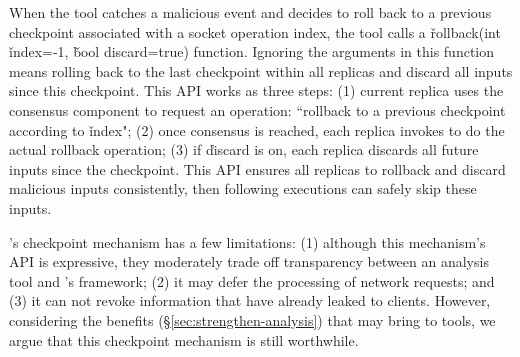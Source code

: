 When the tool catches a malicious event and decides to roll back to a previous
checkpoint associated with a socket operation index, the tool calls a 
\v{rollback(int} \v{index=-1,} \v{bool discard=true)} function. Ignoring the 
arguments in this function means rolling back to the last checkpoint within all 
replicas and discard all inputs since this checkpoint. This API works as three 
steps: (1) current replica uses the \paxos consensus component to request an 
operation: ``rollback to a previous checkpoint according to \v{index}"; (2) 
once consensus is reached, each replica invokes \criu to do the actual rollback 
operation; (3) if \v{discard} is on, each replica discards all future inputs 
since the checkpoint. This API ensures all replicas to rollback and discard 
malicious inputs consistently, then following executions can safely skip these 
inputs.


\xxx's checkpoint mechanism has a few limitations: (1) although this mechanism's 
API is expressive, they moderately trade off transparency between an analysis 
tool and \xxx's framework; (2) it may defer the processing of network requests; 
and (3) it can not revoke information that have already leaked to clients. 
However, considering the benefits (\S\ref{sec:strengthen-analysis}) that \xxx 
may bring to tools, we argue that this checkpoint mechanism is still worthwhile.





